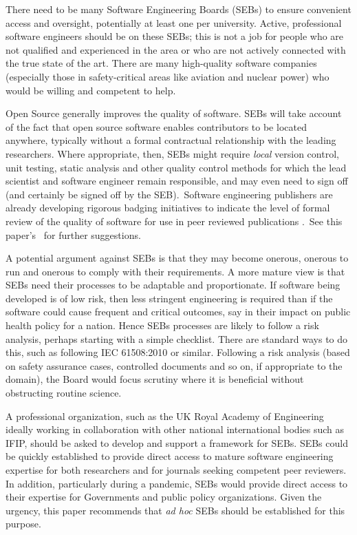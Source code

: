 \documentclass{comjnl}
\begin{document}
There need to be many Software Engineering Boards (SEBs) to ensure convenient access and oversight, potentially at least one per university. Active, professional software engineers should be on these SEBs; this is not a job for people who are not qualified and experienced in the area or who are not actively connected with the true state of the art. There are many high-quality software companies (especially those in safety-critical areas like aviation and nuclear power) who would be willing and competent to help.

Open Source generally improves the quality of software. SEBs will take account of the fact that open source software enables contributors to be located anywhere, typically without a formal contractual relationship with the leading researchers. Where appropriate, then, SEBs might require \emph{local\/} version control, unit testing, static analysis {and other quality control methods for which the lead scientist and software engineer remain responsible, and may even need to sign off (and certainly be signed off by the SEB\@).}\ {Software engineering publishers are already developing rigorous badging initiatives to indicate the level of formal review of the quality of software for use in peer reviewed publications \cite{acm-artifacts}.}\ {See this paper's \supplement\ for further suggestions.}

A potential argument against SEBs is that they may become onerous, onerous to run and onerous to comply with their requirements. A more mature view is that SEBs need their processes to be adaptable and proportionate. If software being developed is of low risk, then less stringent engineering is required than if the software could cause frequent and critical outcomes, say in their impact on public health policy for a nation. Hence SEBs processes are likely to follow a risk analysis, perhaps starting with a simple checklist. {There are standard ways to do this, such as following IEC 61508:2010 \cite{redmill,iec61508} or similar. Following a risk analysis (based on safety assurance cases, controlled documents and so on, if appropriate to the domain), the Board would focus scrutiny where it is beneficial without obstructing routine science.}

A professional organization, such as the UK Royal Academy of Engineering ideally working in collaboration with other national international bodies such as IFIP, should be asked to develop and support a framework for SEBs. SEBs could be quickly established to provide direct access to mature software engineering expertise for both researchers and for journals seeking competent peer reviewers. In addition, particularly during a pandemic, SEBs would provide direct access to their expertise for Governments and public policy organizations. Given the urgency, this paper recommends that \emph{ad hoc\/} SEBs should be established for this purpose.
\end{document}
